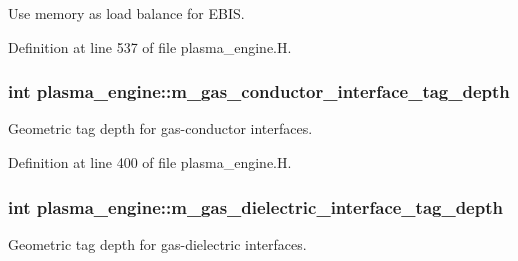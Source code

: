 Use memory as load balance for E\+B\+IS. 



Definition at line 537 of file plasma\+\_\+engine.\+H.

\subsubsection[{\texorpdfstring{m\+\_\+gas\+\_\+conductor\+\_\+interface\+\_\+tag\+\_\+depth}{m_gas_conductor_interface_tag_depth}}]{\setlength{\rightskip}{0pt plus 5cm}int plasma\+\_\+engine\+::m\+\_\+gas\+\_\+conductor\+\_\+interface\+\_\+tag\+\_\+depth\hspace{0.3cm}{\ttfamily [protected]}}\hypertarget{classplasma__engine_abc3299bed546c07295273a0196d11c3b}{}\label{classplasma__engine_abc3299bed546c07295273a0196d11c3b}


Geometric tag depth for gas-\/conductor interfaces. 



Definition at line 400 of file plasma\+\_\+engine.\+H.

\subsubsection[{\texorpdfstring{m\+\_\+gas\+\_\+dielectric\+\_\+interface\+\_\+tag\+\_\+depth}{m_gas_dielectric_interface_tag_depth}}]{\setlength{\rightskip}{0pt plus 5cm}int plasma\+\_\+engine\+::m\+\_\+gas\+\_\+dielectric\+\_\+interface\+\_\+tag\+\_\+depth\hspace{0.3cm}{\ttfamily [protected]}}\hypertarget{classplasma__engine_af44aeef40ef6338b229d04dbb3f4287b}{}\label{classplasma__engine_af44aeef40ef6338b229d04dbb3f4287b}


Geometric tag depth for gas-\/dielectric interfaces. 



